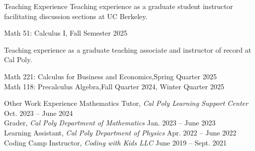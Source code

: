 \documentclass[
	11pt, %
]{cv} %
\begin{document}
\begin{rSection}{Teaching Experience}
	Teaching experience as a graduate student instructor facilitating discussion sections at UC Berkeley.

	Math 51: Calculus I, \dotfill Fall Semester 2025

	Teaching experience as a graduate teaching associate and instructor of record at Cal Poly.

	Math 221: Calculus for Business and Economics,\dotfill Spring Quarter 2025 \\
	Math 118: Precalculus Algebra,\dotfill Fall Quarter 2024, Winter Quarter 2025
\end{rSection}

\begin{rSection}{Other Work Experience}
	Mathematics Tutor, \textit{Cal Poly Learning Support Center} \dotfill Oct. 2023 -- June 2024 \\
	Grader, \textit{Cal Poly Department of Mathematics} \dotfill Jan. 2023 -- June 2023 \\
	Learning Assistant, \textit{Cal Poly Department of Physics} \dotfill Apr. 2022 -- June 2022 \\
	Coding Camp Instructor, \textit{Coding with Kids LLC} \dotfill June 2019 -- Sept. 2021
\end{rSection}
\end{document}
